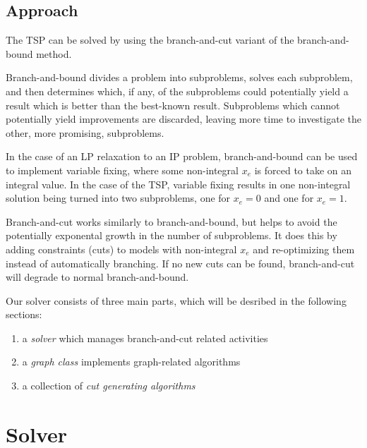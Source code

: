 \documentclass{article}
\begin{document}
\subsection{Approach}

The TSP can be solved
by using the branch-and-cut variant
of the branch-and-bound method.

Branch-and-bound divides a problem into subproblems,
solves each subproblem,
and then determines which, if any, of the subproblems
could potentially yield a result
which is better than the best-known result.
Subproblems which cannot potentially yield improvements are discarded,
leaving more time to investigate the other, more promising, subproblems.

In the case of an LP relaxation to an IP problem,
branch-and-bound can be used to implement variable fixing,
where some non-integral $x_e$ is forced to take on an integral value.
In the case of the TSP, variable fixing results
in one non-integral solution
being turned into two subproblems,
one for $x_e = 0$ and one for $x_e = 1$.

Branch-and-cut works similarly to branch-and-bound,
but helps to avoid the potentially exponental growth
in the number of subproblems.  It does this by adding
constraints (cuts) to models with non-integral $x_e$
and re-optimizing them instead of automatically branching.
If no new cuts can be found,
branch-and-cut will degrade to normal branch-and-bound.

Our solver consists of three main parts, which will be desribed in the following sections:
\begin{enumerate}
\item a \textit{solver} which manages branch-and-cut related activities
\item a \textit{graph class} implements graph-related algorithms
\item a collection of \textit{cut generating algorithms}
\end{enumerate}

\section{Solver}
\end{document}
